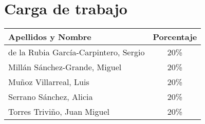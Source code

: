 \documentclass[12pt,a4paper,spanish,twoside]{book}
\begin{document}
% 

% 

\chapter{Carga de trabajo}
\begin{center}
 \begin{tabular}{|p{10cm}|c|}\hline 
  Apellidos y Nombre & Porcentaje \\ \hline \hline
  de la Rubia García-Carpintero, Sergio & 20\% \\ \hline
  Millán Sánchez-Grande, Miguel & 20\% \\ \hline
  Muñoz Villarreal, Luis & 20\% \\ \hline
  Serrano Sánchez, Alicia & 20\% \\ \hline
  Torres Triviño, Juan Miguel & 20\% \\ \hline 
 \end{tabular}
\end{center}

%  
% 
\end{document}
